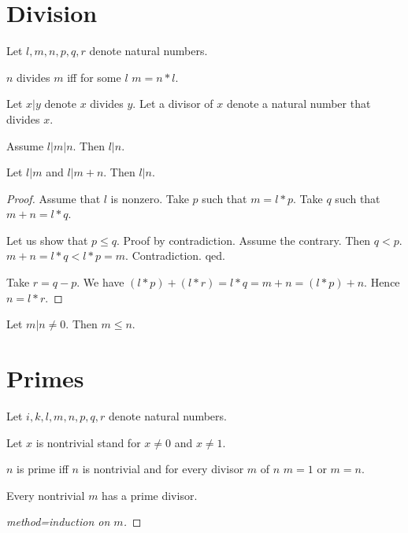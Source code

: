 \documentclass[11pt]{article}
\begin{document}
\section{Division}

\begin{forthel}
Let $l,m,n,p,q,r$ denote natural numbers.

\begin{definition}
$n$ divides $m$ iff for some $l$ $m = n * l$.
\end{definition}

Let $x | y$ denote $x$ divides $y$.
Let a divisor of $x$ denote a natural number that divides $x$.

\begin{lemma}
Assume $l | m | n$.
Then $l | n$.
\end{lemma}

\begin{lemma}
Let $l | m$ and $l | m + n$.
Then $l | n$.
\end{lemma}
\begin{proof}
Assume that $l$ is nonzero.
Take $p$ such that $m = l * p$.
Take $q$ such that $m + n = l * q$.

Let us show that
$p \leq q$.
Proof by contradiction.
Assume the contrary. Then $q < p$.
$m+n = l * q < l * p = m$.
Contradiction. qed.

Take $r = q - p$.
We have $(l * p) + (l * r) = l * q = m + n = (l * p) + n$.
Hence $n = l * r$.
\end{proof}

\begin{lemma}
Let $m | n \neq 0$.
Then $m \leq n$.
\end{lemma}

\end{forthel}


\section{Primes}

\begin{forthel}
Let $i,k,l,m,n,p,q,r$ denote natural numbers.

Let $x$ is nontrivial stand for $x \neq 0$ and $x \neq 1$.

\begin{definition}
$n$ is prime iff $n$ is nontrivial and
for every divisor $m$ of $n$ $m = 1$ or $m = n$.
\end{definition}

\begin{lemma}
Every nontrivial $m$ has a prime divisor.
\end{lemma}
\begin{proof}[method=induction on $m$]
\end{proof}

\end{forthel}
\end{document}
